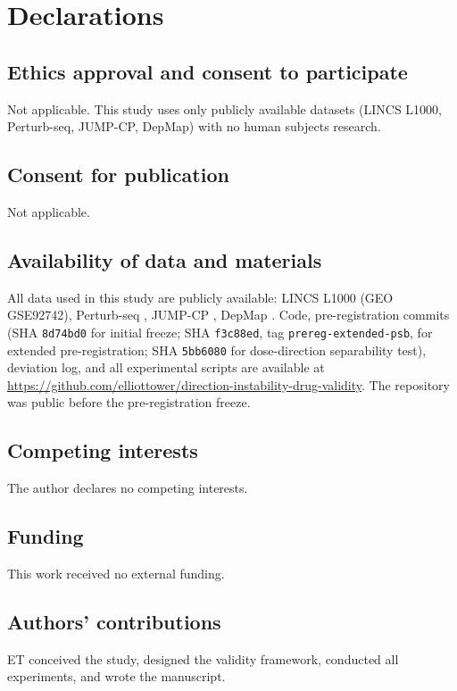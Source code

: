 \documentclass[11pt]{article}
\begin{document}
\section*{Declarations}

\subsection*{Ethics approval and consent to participate}
Not applicable. This study uses only publicly available datasets
(LINCS L1000, Perturb-seq, JUMP-CP, DepMap) with no human subjects
research.

\subsection*{Consent for publication}
Not applicable.

\subsection*{Availability of data and materials}
All data used in this study are publicly available: LINCS L1000
(GEO GSE92742), Perturb-seq \citep{replogle2022mapping}, JUMP-CP
\citep{chandrasekaran2023jump}, DepMap \citep{dempster2021chronos}.
Code, pre-registration commits (SHA \texttt{8d74bd0} for initial
freeze; SHA \texttt{f3c88ed}, tag \texttt{prereg-extended-psb}, for
extended pre-registration; SHA \texttt{5bb6080} for dose-direction
separability test), deviation log, and all experimental scripts are
available at
\url{https://github.com/elliottower/direction-instability-drug-validity}.
The repository was public before the pre-registration freeze.

\subsection*{Competing interests}
The author declares no competing interests.

\subsection*{Funding}
This work received no external funding.

\subsection*{Authors' contributions}
ET conceived the study, designed the validity framework, conducted
all experiments, and wrote the manuscript.
\end{document}
